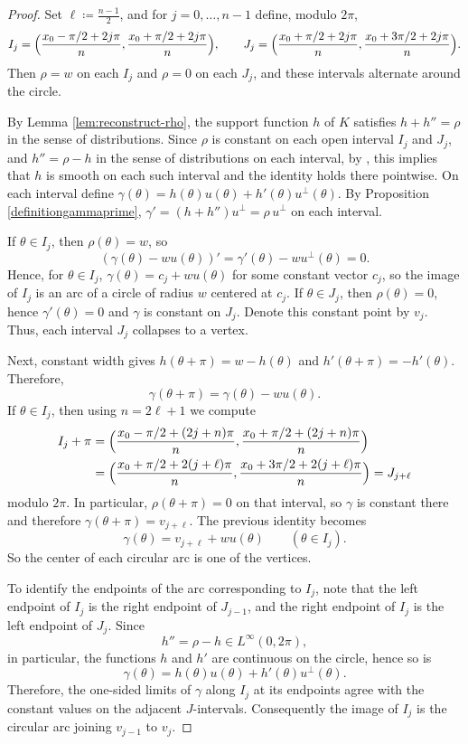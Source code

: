 \documentclass[11pt,letterpaper,reqno]{amsart}
\begin{document}
\begin{proof}
Set $\ell\coloneqq \frac{n-1}{2}$, and for $j=0,\dots,n-1$ define, modulo $2\pi$,
\[
I_j=\Bigl(\frac{x_0-\pi/2+2j\pi}{n},\frac{x_0+\pi/2+2j\pi}{n}\Bigr),
\qquad
J_j=\Bigl(\frac{x_0+\pi/2+2j\pi}{n},\frac{x_0+3\pi/2+2j\pi}{n}\Bigr).
\]
Then $\rho=w$ on each $I_j$ and $\rho=0$ on each $J_j$, and these intervals alternate around the circle.

By Lemma \ref{lem:reconstruct-rho}, the support function $h$ of $K$ satisfies $h+h''=\rho$ in the sense of distributions. Since $\rho$ is constant on each open interval $I_j$ and $J_j$, and $h''=\rho-h$ in the sense of distributions on each interval, 
by \cite[Proposition 1.3.18(4)]{OW}, this implies that $h$ is smooth on each such interval and the identity holds there pointwise. On each interval define
\(
\gamma(\theta)=h(\theta)u(\theta)+h'(\theta)u^\perp(\theta).
\)
By Proposition \ref{definitiongammaprime}, $\gamma'=(h+h'')u^\perp=\rho\,u^\perp$ on each interval.



If $\theta\in I_j$, then $\rho(\theta)=w$, so
\[
(\gamma(\theta)-w u(\theta))'=\gamma'(\theta)-w u^\perp(\theta)=0.
\]
Hence, for $\theta\in I_j$,
\(
\gamma(\theta)=c_j+w u(\theta)
\)
for some constant vector $c_j$, so the image of $I_j$ is an arc of a circle of radius $w$ centered at $c_j$.
If $\theta\in J_j$, then $\rho(\theta)=0$, hence $\gamma'(\theta)=0$ and $\gamma$ is constant on $J_j$. Denote this constant point by $v_j$. Thus, each interval $J_j$ collapses to a vertex.


Next, constant width gives $h(\theta+\pi)=w-h(\theta)$ and $h'(\theta+\pi)=-h'(\theta)$. Therefore,
\[
\gamma(\theta+\pi)=\gamma(\theta)-w u(\theta).
\]
If $\theta\in I_j$, then using $n=2\ell+1$ we compute
\begin{align*}
I_j+\pi
&=
\Bigl(\frac{x_0-\pi/2+(2j+n)\pi}{n},\frac{x_0+\pi/2+(2j+n)\pi}{n}\Bigr)\\
&=
\Bigl(\frac{x_0+\pi/2+2(j+\ell)\pi}{n},\frac{x_0+3\pi/2+2(j+\ell)\pi}{n}\Bigr)
=J_{j+\ell}
\end{align*}
modulo $2\pi$. In particular, $\rho(\theta+\pi)=0$ on that interval, so $\gamma$ is constant there and therefore $\gamma(\theta+\pi)=v_{j+\ell}$. The previous identity becomes
\[
\gamma(\theta)=v_{j+\ell}+w u(\theta)
\qquad (\theta\in I_j).
\]
So the center of each circular arc is one of the vertices.

To identify the endpoints of the arc corresponding to $I_j$, note that the left endpoint of $I_j$ is the right endpoint of $J_{j-1}$, and the right endpoint of $I_j$ is the left endpoint of $J_j$. Since
\[
h''=\rho-h\in L^\infty(0,2\pi),
\]
in particular, the functions $h$ and $h'$ are continuous on the circle, hence so is
\[
\gamma(\theta)=h(\theta)u(\theta)+h'(\theta)u^\perp(\theta).
\]
Therefore, the one-sided limits of $\gamma$ along $I_j$ at its endpoints agree with the constant values on the adjacent $J$-intervals. Consequently the image of $I_j$ is the circular arc joining $v_{j-1}$ to $v_j$.


\end{proof}
\end{document}
